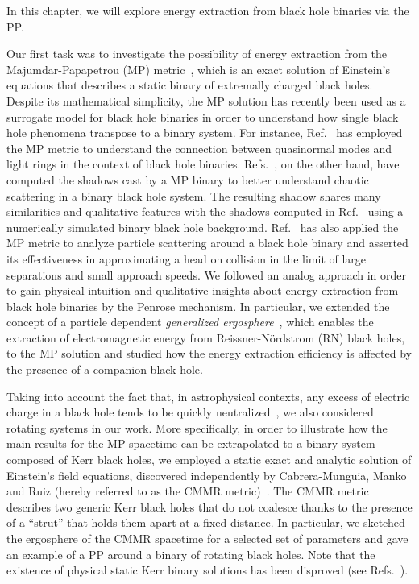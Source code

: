 In this chapter, we will explore energy extraction from black hole binaries via the \ac{PP}.

Our first task was to investigate the possibility of energy extraction from the Majumdar-Papapetrou (\ac{MP}) metric~\cite{MAJUMDAR1947,PAPAPETROU1947}, which is an exact solution of Einstein's equations that describes a static binary of extremally charged black holes. Despite its mathematical simplicity, the \ac{MP} solution has recently been used as a surrogate model for black hole binaries in order to understand how single black hole phenomena transpose to a binary system. For instance, Ref.~\cite{ASSUMPCAO2018} has employed the \ac{MP} metric to understand the connection between quasinormal modes and light rings in the context of black hole binaries. Refs.~\cite{Shipley:2016omi,Shipley:2019kfq}, on the other hand, have computed the shadows cast by a \ac{MP} binary to better understand chaotic scattering in a binary black hole system. The resulting shadow shares many similarities and qualitative features with the shadows computed in Ref.~\cite{Bohn:2014xxa} using a numerically simulated binary black hole background. Ref.~\cite{BINI2019} has also applied the \ac{MP} metric to analyze particle scattering around a black hole binary and asserted its effectiveness in approximating a head on collision in the limit of large separations and small approach speeds. We followed an analog approach in order to gain physical intuition and qualitative insights about energy extraction from black hole binaries by the Penrose mechanism. In particular, we extended the concept of a particle dependent \emph{generalized ergosphere}~\cite{RUFFINI1971}, which enables the extraction of electromagnetic energy from Reissner-N\"ordstrom (RN) black holes, to the \ac{MP} solution and studied how the energy extraction efficiency is affected by the presence of a companion black hole.

Taking into account the fact that, in astrophysical contexts, any excess of electric charge in a black hole tends to be quickly neutralized~\cite{gibbons1975}, we also considered rotating systems in our work. More specifically, in order to illustrate how the main results for the \ac{MP} spacetime can be extrapolated to a binary system composed of Kerr black holes, we employed a static exact and analytic solution of Einstein's field equations, discovered independently by Cabrera-Munguia, Manko and Ruiz (hereby referred to as the \ac{CMMR} metric)~\cite{cabrera_metric,manko_ruiz_metric, manko_ruiz_thermo}. The \ac{CMMR} metric describes two generic Kerr black holes that do not coalesce thanks to the presence of a ``strut'' that holds them apart at a fixed distance. In particular, we sketched the ergosphere of the \ac{CMMR} spacetime for a selected set of parameters and gave an example of a \ac{PP} around a binary of rotating black holes. Note that the existence of physical static Kerr binary solutions has been disproved (see Refs.~\cite{Neugebauer2009,Hennig2011}).

